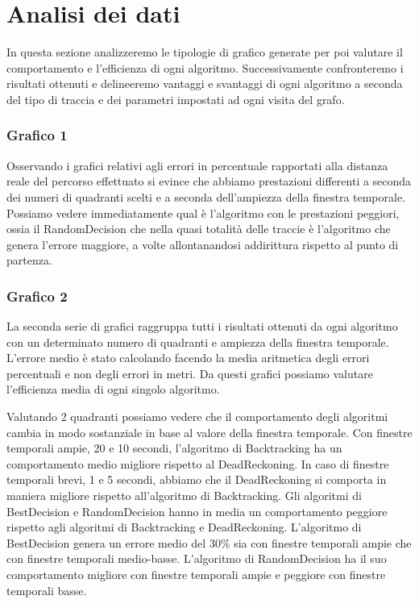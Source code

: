 \documentclass[12pt,a4paper,openright,twoside]{report}
\begin{document}
\newpage
\section{Analisi dei dati}
In questa sezione analizzeremo le tipologie di grafico generate per poi valutare il comportamento e l'efficienza di ogni algoritmo. Successivamente confronteremo i risultati ottenuti e delineeremo vantaggi e svantaggi di ogni algoritmo a seconda del tipo di traccia e dei parametri impostati ad ogni visita del grafo.

\subsubsection{Grafico 1}
Osservando i grafici relativi agli errori in percentuale rapportati alla distanza reale del percorso effettuato si evince che abbiamo prestazioni differenti a seconda dei numeri di quadranti scelti e a seconda dell'ampiezza della finestra temporale.
Possiamo vedere immediatamente qual è l'algoritmo con le prestazioni peggiori, ossia il RandomDecision che nella quasi totalità delle traccie è l'algoritmo che genera l'errore maggiore, a volte allontanandosi addirittura rispetto al punto di partenza.

\subsubsection{Grafico 2}
La seconda serie di grafici raggruppa tutti i risultati ottenuti da ogni algoritmo con un determinato numero di quadranti e ampiezza della finestra temporale. L'errore medio è stato calcolando facendo la media aritmetica degli errori percentuali e non degli errori in metri.
Da questi grafici possiamo valutare l'efficienza media di ogni singolo algoritmo.

Valutando 2 quadranti possiamo vedere che il comportamento degli algoritmi cambia in modo sostanziale in base al valore della finestra temporale. Con finestre temporali ampie, 20 e 10 secondi, l'algoritmo di Backtracking ha un comportamento medio migliore rispetto al DeadReckoning. In caso di finestre temporali brevi, 1 e 5 secondi, abbiamo che il DeadReckoning si comporta in maniera migliore rispetto all'algoritmo di Backtracking.
Gli algoritmi di BestDecision e RandomDecision hanno in media un comportamento peggiore rispetto agli algoritmi di Backtracking e DeadReckoning. L'algoritmo di BestDecision genera un errore medio del 30\% sia con finestre temporali ampie che con finestre temporali medio-basse. L'algoritmo di RandomDecision ha il suo comportamento migliore con finestre temporali ampie e peggiore con finestre temporali basse.
\end{document}
